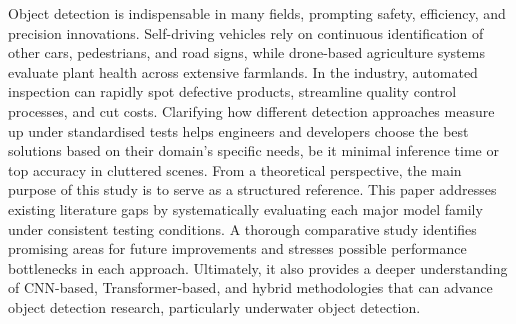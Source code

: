 Object detection is indispensable in many fields, prompting safety, efficiency, and precision innovations. Self-driving vehicles rely on continuous identification of other cars, pedestrians, and road signs, while drone-based agriculture systems evaluate plant health across extensive farmlands. In the industry, automated inspection can rapidly spot defective products, streamline quality control processes, and cut costs. Clarifying how different detection approaches measure up under standardised tests helps engineers and developers choose the best solutions based on their domain’s specific needs, be it minimal inference time or top accuracy in cluttered scenes.
From a theoretical perspective, the main purpose of this study is to serve as a structured reference. This paper addresses existing literature gaps by systematically evaluating each major model family under consistent testing conditions. A thorough comparative study identifies promising areas for future improvements and stresses possible performance bottlenecks in each approach. Ultimately, it also provides a deeper understanding of CNN-based, Transformer-based, and hybrid methodologies that can advance object detection research, particularly underwater object detection.
